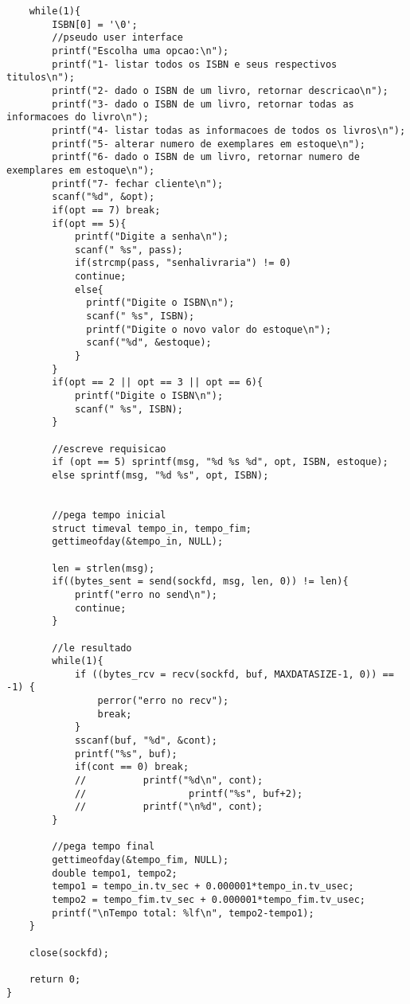 \documentclass[11pt, brazil]{article} %
\begin{document}
\begin{verbatim}
	while(1){
		ISBN[0] = '\0';
		//pseudo user interface
		printf("Escolha uma opcao:\n");
		printf("1- listar todos os ISBN e seus respectivos titulos\n");
		printf("2- dado o ISBN de um livro, retornar descricao\n");
		printf("3- dado o ISBN de um livro, retornar todas as informacoes do livro\n");
		printf("4- listar todas as informacoes de todos os livros\n");
		printf("5- alterar numero de exemplares em estoque\n");
		printf("6- dado o ISBN de um livro, retornar numero de exemplares em estoque\n");
		printf("7- fechar cliente\n");
		scanf("%d", &opt);
		if(opt == 7) break;
		if(opt == 5){
			printf("Digite a senha\n");
			scanf(" %s", pass);
			if(strcmp(pass, "senhalivraria") != 0)
			continue;
			else{
			  printf("Digite o ISBN\n");
			  scanf(" %s", ISBN);
			  printf("Digite o novo valor do estoque\n");
			  scanf("%d", &estoque);
			}
		}
		if(opt == 2 || opt == 3 || opt == 6){
			printf("Digite o ISBN\n");
			scanf(" %s", ISBN);
		}
		
		//escreve requisicao
		if (opt == 5) sprintf(msg, "%d %s %d", opt, ISBN, estoque);
		else sprintf(msg, "%d %s", opt, ISBN);  
		
		
		//pega tempo inicial
		struct timeval tempo_in, tempo_fim;
		gettimeofday(&tempo_in, NULL);
		
		len = strlen(msg);
		if((bytes_sent = send(sockfd, msg, len, 0)) != len){
			printf("erro no send\n");
			continue;	
		}
	
		//le resultado
		while(1){
		    if ((bytes_rcv = recv(sockfd, buf, MAXDATASIZE-1, 0)) == -1) {
		        perror("erro no recv");
		        break;
		    }
		    sscanf(buf, "%d", &cont);    		    
		    printf("%s", buf);
		    if(cont == 0) break;
		    //		    printf("%d\n", cont);
		    //       		    printf("%s", buf+2);
		    //		    printf("\n%d", cont);
		}
		
		//pega tempo final
		gettimeofday(&tempo_fim, NULL);
		double tempo1, tempo2;
		tempo1 = tempo_in.tv_sec + 0.000001*tempo_in.tv_usec;
		tempo2 = tempo_fim.tv_sec + 0.000001*tempo_fim.tv_usec;
		printf("\nTempo total: %lf\n", tempo2-tempo1);
	}

    close(sockfd);

    return 0;
}
\end{verbatim}
\end{document}
